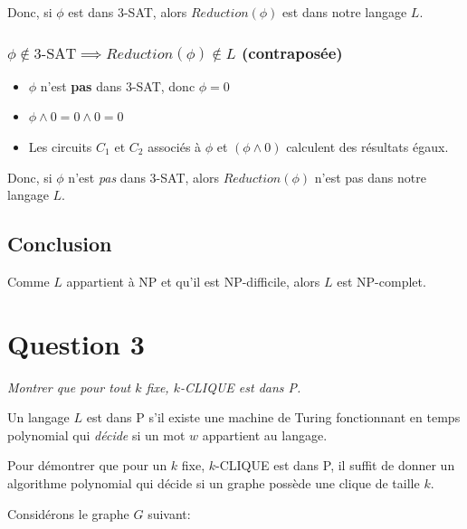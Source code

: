 \documentclass[10pt]{article}
\begin{document}
Donc, si $\phi$ est dans 3-SAT, alors $Reduction(\phi)$ est dans notre
langage $L$.


\subsubsection{$\phi \not\in \text{3-SAT} \implies Reduction(\phi)
  \not\in L$ (contraposée)}

\begin{itemize}
\item $\phi$ n'est \textbf{pas} dans 3-SAT, donc $\phi = 0$
\item $\phi \wedge 0 = 0 \wedge 0 = 0$
\item Les circuits $C_1$ et $C_2$ associés à $\phi$ et $(\phi \wedge 0)$
  calculent des résultats égaux.
\end{itemize}

Donc, si $\phi$ n'est \emph{pas} dans 3-SAT, alors $Reduction(\phi)$
n'est pas dans notre langage $L$.

\subsection{Conclusion}

Comme $L$ appartient à NP et qu'il est NP-difficile, alors $L$ est NP-complet.

\newpage

\section{Question 3}

\emph{Montrer que pour tout $k$ fixe, $k$-CLIQUE est dans P.}

Un langage $L$ est dans P s'il existe une machine de Turing
fonctionnant en temps polynomial qui \emph{décide} si un mot $w$
appartient au langage.

Pour démontrer que pour un $k$ fixe, $k$-CLIQUE est dans P, il suffit
de donner un algorithme polynomial qui décide si un graphe possède une
clique de taille $k$.

Considérons le graphe $G$ suivant:
\end{document}
